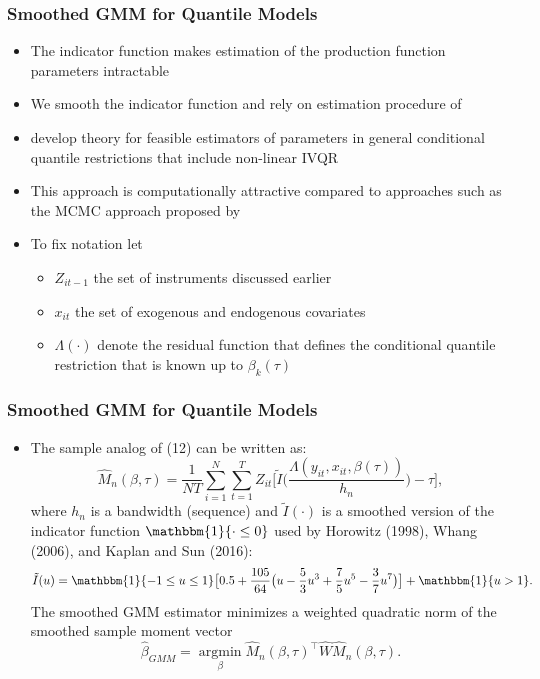 \documentclass{beamer}
\begin{document}
\begin{frame}
\frametitle{Smoothed GMM for Quantile Models}
\begin{itemize}
	\item The indicator function makes estimation of the production function parameters intractable
	\item We smooth the indicator function and rely on estimation procedure of \textcite{Kaplan2016}
	\item \textcite{qgmm} develop theory for feasible estimators of parameters in general conditional quantile restrictions that include non-linear IVQR
	\item This approach is computationally attractive compared to approaches such as the MCMC approach proposed by \textcite{Chernozhukov2003}
	\item To fix notation let
	\begin{itemize}
		\item $Z_{it-1}$ the set of instruments discussed earlier
		\item $x_{it}$ the set of exogenous and endogenous covariates
		\item $\Lambda(\cdot)$ denote the residual function that defines the conditional quantile restriction that is known up to $\beta_{k}(\tau)$
	\end{itemize}
	
\end{itemize}
\end{frame}

\begin{frame}
\frametitle{Smoothed GMM for Quantile Models}
\begin{itemize}
	\item The sample analog of (12) can be written as:
	\begin{equation}
    \hat{M}_{n}(\beta, \tau)=\frac{1}{NT}\sum_{i=1}^{N}\sum_{t=1}^{T}Z_{it}\Bigg[\tilde{I}\Bigg(\frac{\Lambda(y_{it}, x_{it}, \beta(\tau))}{h_{n}}\Bigg)-\tau\Bigg],
	\end{equation}
	where $h_{n}$ is a bandwidth (sequence) and $\tilde{I}(\cdot)$ is a smoothed version of the indicator function $\mathbbm{1}\{\cdot \leq 0\}$ used by Horowitz (1998), Whang (2006), and Kaplan and Sun (2016):
	\begin{equation}
	    \tilde{I}(u)=\mathbbm{1}\{-1\leq u \leq 1\}\big[0.5+\frac{105}{64}\big(u-\frac{5}{3}u^{3}+\frac{7}{5}u^{5}- \frac{3}{7}u^{7}\big)\big]+\mathbbm{1}\{u>1\}.
	\end{equation}
	The smoothed GMM estimator minimizes a weighted quadratic norm of the smoothed sample moment vector
	\begin{equation}
		\hat{\beta}_{GMM}=\underset{\beta}{\operatorname{argmin}}\hat{M}_{n}(\beta, \tau)^{\top}\hat{W}\hat{M}_{n}(\beta, \tau).
		\end{equation}
\end{itemize}
\end{frame}
\end{document}
